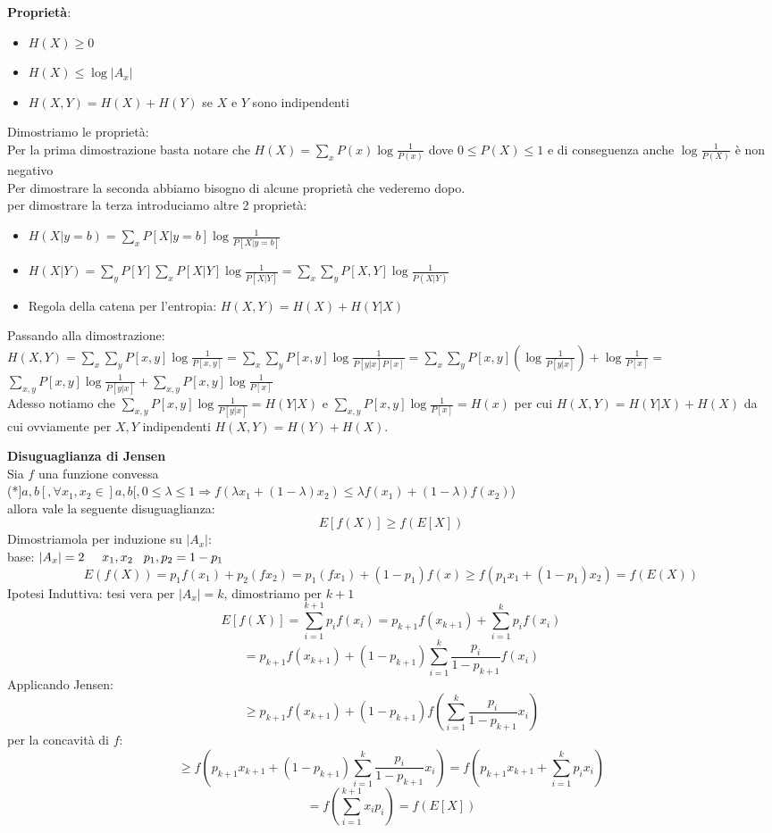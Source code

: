 \documentclass{report}
\begin{document}
\textbf{Proprietà}:
\begin{itemize}
    \item $H(X)\ge 0$
    \item $H(X)\le \log \left| A_x \right|$
    \item $H(X,Y) = H(X)+H(Y)$ se $X$ e $Y$ sono indipendenti
\end{itemize}

Dimostriamo le proprietà:
\\ Per la prima dimostrazione basta notare che $H(X) = \sum_x P(x)\log\frac{1}{P(x)}$ dove $0\le P(X) \le 1$ e di conseguenza anche $\log\frac{1}{P(X)}$ è non negativo 
\\ Per dimostrare la seconda abbiamo bisogno di alcune proprietà che vederemo dopo.
\\per dimostrare la terza introduciamo altre 2 proprietà:
\begin{itemize}
    \item $H(X|y = b) = \sum_xP[X|y=b]\log \frac{1}{P[X|y=b]}$
    \item $H(X|Y) = \sum_yP[Y]\sum_xP[X|Y]\log \frac{1}{P[X|Y]} = \sum_x\sum_yP[X,Y]\log\frac{1}{P(X|Y)}$
    \item Regola della catena per l'entropia: $H(X,Y) = H(X) + H(Y|X)$
\end{itemize}
Passando alla dimostrazione: \\$H(X,Y) = \sum_x\sum_yP[x,y]\log\frac{1}{P[x,y]}=\sum_x\sum_y P[x,y]\log\frac{1}{P[y|x]P[x]}=\sum_x\sum_yP[x,y](\log\frac{1}{P[y|x]})+\log\frac{1}{P[x]} = $$ \sum_{x,y} P[x,y]\log\frac{1}{P[y|x]}+\sum_{x,y}P[x,y]\log\frac{1}{P[x]}$ \\Adesso notiamo che $\sum_{x,y} P[x,y]\log\frac{1}{P[y|x]} = H(Y|X)$ e $\sum_{x,y}P[x,y]\log\frac{1}{P[x]} = H(x)$ per cui $H(X,Y) = H(Y|X)+H(X)$ da cui ovviamente per $X,Y$ indipendenti $H(X,Y) = H(Y)+H(X)$.

\textbf{Disuguaglianza di Jensen}
\\ Sia $f$ una funzione convessa 
\\(*$]a,b[ ,\forall x_1,x_2\in]a,b[,0\le\lambda\le1 \Rightarrow f(\lambda x_1+(1-\lambda)x_2)\le \lambda f(x_1)+(1-\lambda)f(x_2)$)
\\allora vale la seguente disuguaglianza: $$E[f(X)]\ge f(E[X])$$
Dimostriamola per induzione su $\left| A_x \right|$:
\\base: $\left| A_x \right| = 2 \hspace{0.5cm} x_1,x_2 \hspace{0.3cm} p_1,p_2=1-p_1$
$$E(f(X))=p_1f(x_1)+p_2(fx_2)=p_1(fx_1)+(1-p_1)f(x)\ge f(p_1x_1+(1-p_1)x_2)=f(E(X))$$
Ipotesi Induttiva: tesi vera per $\left| A_x \right| = k$, dimostriamo per $k+1$
$$E[f(X)] = \sum^{k+1}_{i=1}p_if(x_i)=p_{k+1}f(x_{k+1})+\sum^k_{i=1}p_if(x_i)$$
$$= p_{k+1}f(x_{k+1})+(1-p_{k+1})\sum^k_{i=1}\frac{p_i}{1-p_{k+1}}f(x_i)$$
Applicando Jensen:
$$\ge p_{k+1}f(x_{k+1})+(1-p_{k+1})f\left(\sum^k_{i=1}\frac{p_i}{1-p_{k+1}}x_i\right)$$
per la concavità di $f$:
$$\ge f\left(p_{k+1}x_{k+1}+(1-p_{k+1})\sum^k_{i=1}\frac{p_i}{1-p_{k+1}}x_i\right) = f\left(p_{k+1}x_{k+1}+\sum^k_{i=1}p_ix_i\right)$$
$$= f\left( \sum^{k+1}_{i=1}x_ip_i\right)=f(E[X])$$
\end{document}
